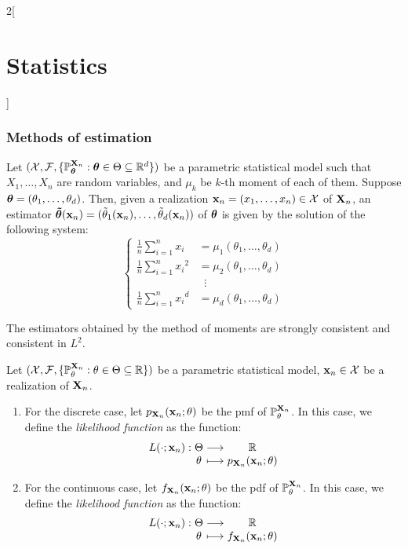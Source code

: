 \documentclass[../../../main.tex]{subfiles}
\begin{document}
\begin{multicols}{2}[\section{Statistics}]
  \subsubsection{Methods of estimation}
  \begin{definition}
    Let $(\mathcal{X},\mathcal{F},\{\mathbb{P}_{\boldsymbol{\mathrm{\theta}}}^{\boldsymbol{\mathrm{X}}_n}:\boldsymbol{\mathrm{\theta}}\in\Theta\subseteq \mathbb{R}^d\})$ be a parametric statistical model such that $X_1,\ldots,X_n$ are \iid random variables, and $\mu_k$ be $k$-th moment of each of them. Suppose $\boldsymbol{\mathrm{\theta}}=(\theta_1,\ldots,\theta_d)$. Then, given a realization $\boldsymbol{\mathrm{x}}_n=(x_1,\ldots,x_n)\in\mathcal{X}$ of $\boldsymbol{\mathrm{X}}_n$, an estimator $\boldsymbol{\mathrm{\tilde{\theta}}}(\boldsymbol{\mathrm{x}}_n)=(\tilde{\theta}_1(\boldsymbol{\mathrm{x}}_n),\ldots,\tilde{\theta}_d(\boldsymbol{\mathrm{x}}_n))$ of $\boldsymbol{\mathrm{\theta}}$ is given by the solution of the following system:
    $$
      \left\{
      \begin{aligned}
        \frac{1}{n}\sum_{i=1}^nx_i     & =\mu_1(\theta_1,\ldots,\theta_d) \\
        \frac{1}{n}\sum_{i=1}^n{x_i}^2 & =\mu_2(\theta_1,\ldots,\theta_d) \\
                                       & \;\;\vdots                       \\
        \frac{1}{n}\sum_{i=1}^n{x_i}^d & =\mu_d(\theta_1,\ldots,\theta_d)
      \end{aligned}
      \right.
    $$
  \end{definition}
  \begin{proposition}
    The estimators obtained by the method of moments are strongly consistent and consistent in $L^2$.
  \end{proposition}
  \begin{definition}[Likelihood]
    Let $(\mathcal{X},\mathcal{F},\{\mathbb{P}_{\theta}^{\boldsymbol{\mathrm{X}}_n}:{\theta}\in\Theta\subseteq \mathbb{R}\})$ be a parametric statistical model, $\boldsymbol{\mathrm{x}}_n\in\mathcal{X}$ be a realization of $\boldsymbol{\mathrm{X}}_n$.
    \begin{enumerate}
      \item For the discrete case, let $p_{\boldsymbol{\mathrm{X}}_n}(\boldsymbol{\mathrm{x}}_n;\theta)$ be the pmf of $\mathbb{P}_{\theta}^{\boldsymbol{\mathrm{X}}_n}$. In this case, we define the \emph{likelihood function} as the function:
            $$\function{L(\cdot;\vf{x}_n)}{\Theta}{\RR}{\theta}{p_{\vf{X}_n}(\vf{x}_n;\theta)}$$
      \item For the continuous case, let $f_{\boldsymbol{\mathrm{X}}_n}(\boldsymbol{\mathrm{x}}_n;\theta)$ be the pdf of $\mathbb{P}_{\theta}^{\boldsymbol{\mathrm{X}}_n}$. In this case, we define the \emph{likelihood function} as the function:
            $$\function{L(\cdot;\vf{x}_n)}{\Theta}{\RR}{\theta}{f_{\vf{X}_n}(\vf{x}_n;\theta)}$$

\end{enumerate}
\end{definition}
\end{multicols}
\end{document}
